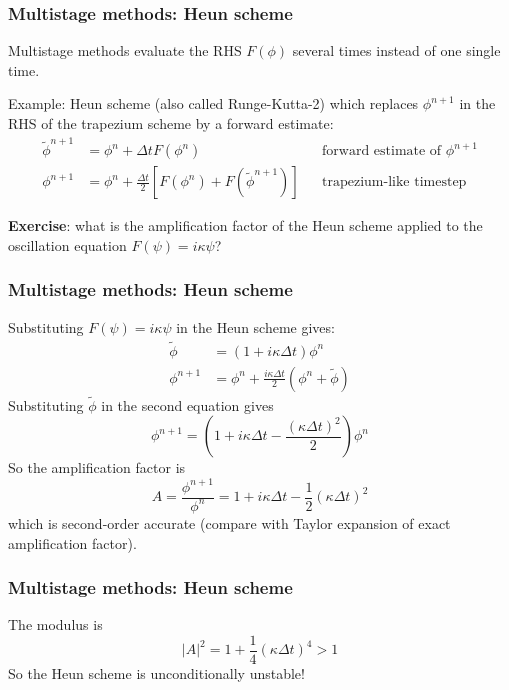 \documentclass[aspectratio=149,9pt]{beamer}
\begin{document}
\begin{frame}
	\frametitle{Multistage methods: Heun scheme}
	Multistage methods evaluate the RHS $F(\phi)$ several times instead of one single time.
	\vspace*{2ex}\par
	Example: Heun scheme (also called Runge-Kutta-2) which replaces $\phi^{n+1}$ in the RHS of the trapezium scheme by a forward estimate:
	\begin{align*}
		\tilde \phi^{n+1}&=\phi^n+\Delta t F(\phi^n)	&& \text{forward estimate of }\phi^{n+1}	\\
		\phi^{n+1}&=\phi^n+\frac{\Delta t}{2}\left[ F(\phi^n)+F(\tilde \phi^{n+1})\right] &&\text{trapezium-like timestep}
	\end{align*}
\pause
	\vspace*{2ex}\par
	\textbf{Exercise}: what is the amplification factor of the Heun scheme applied to the oscillation equation $F(\psi)=i\kappa\psi$?
\end{frame}
%
%
%
\begin{frame}
	\frametitle{Multistage methods: Heun scheme}
	Substituting $F(\psi)=i\kappa\psi$ in the Heun scheme gives:
	\begin{align*}
		\tilde\phi&=(1+i\kappa\Delta t)\phi^n	\\
		\phi^{n+1} &= \phi^n + \frac{i\kappa\Delta t}{2}\left(\phi^n+\tilde \phi\right)
	\end{align*}
\pause
	Substituting $\tilde\phi$ in the second equation gives
	\begin{equation*}
		\phi^{n+1}=\left(1+i\kappa\Delta t-\frac{(\kappa\Delta t)^2}{2}\right)\phi^n
	\end{equation*}
\pause
	So the amplification factor is
	\begin{equation*}
		A = \frac{\phi^{n+1}}{\phi^n}=1 + i \kappa \Delta t - \frac{1}{2} \left( \kappa \Delta t \right)^2
	\end{equation*}
\pause
	which is second-order accurate (compare with Taylor expansion of exact amplification factor).
\end{frame}
%
%
\begin{frame}
	\frametitle{Multistage methods: Heun scheme}
	\vspace*{2ex}
	The modulus is
	\begin{equation*}
		|A|^2 = 1 + \frac{1}{4}\left(\kappa \Delta t \right)^4 > 1
	\end{equation*}
	So the Heun scheme is unconditionally unstable!
\end{frame}
\end{document}

